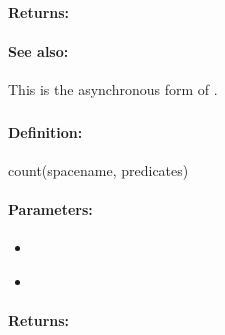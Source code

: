 \paragraph{Returns:}


\paragraph{See also:}  This is the asynchronous form of .

\pagebreak
\subsubsection{}
\label{api:ruby:count}


\paragraph{Definition:}
\begin{rubycode}
count(spacename, predicates)
\end{rubycode}

\paragraph{Parameters:}
\begin{itemize}[noitemsep]
\item {}\\

\item {}\\

\end{itemize}

\paragraph{Returns:}


\pagebreak
\subsubsection{}
\label{api:ruby:async_count}


